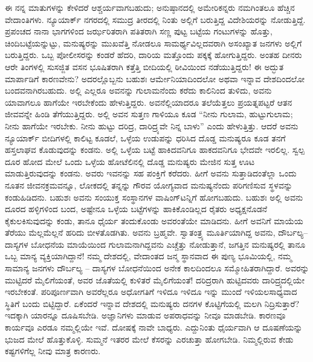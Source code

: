 ಈ ನನ್ನ ಮಾತುಗಳನ್ನು ಕೇಳಿದರೆ ಆಶ್ಚರ್ಯವಾಗಬಹುದು; ಅನುಷ್ಠಾನದಲ್ಲಿ ಅಮೇರಿಕನ್ನರು ನಮಗಿಂತಲೂ ಹೆಚ್ಚಿನ ವೇದಾಂತಿಗಳು. ನ್ಯೂಯಾರ್ಕ್​ ನಗರದಲ್ಲಿ ಸಮುದ್ರ ತೀರದಲ್ಲಿ ನಿಂತು ಅಲ್ಲಿಗೆ ಬರುತ್ತಿದ್ದ ವಿದೇಶಿಯರನ್ನು ನೋಡುತ್ತಿದ್ದೆ. ಪ್ರಪಂಚದ ನಾನಾ ಭಾಗಗಳಿಂದ ಜರ್ಝರಿತರಾಗಿ ಪತಿತರಾಗಿ ಸಣ್ಣ ಪುಟ್ಟ ಬಟ್ಟೆಯ ಗಂಟುಗಳನ್ನು ಹೊತ್ತು, ಚಿಂದಿಬಟ್ಟೆಯನ್ನುಟ್ಟು, ಮನುಷ್ಯರನ್ನು ಮುಖವೆತ್ತಿ ನೋಡಲೂ ಸಾಮರ್ಥ್ಯವಿಲ್ಲದವರಾಗಿ ಅಸಂಖ್ಯಾತ ಜನಗಳು ಅಲ್ಲಿಗೆ ಬರುತ್ತಿದ್ದರು. ಒಬ್ಬ ಪೋಲೀಸರನ್ನು ಕಂಡರೆ ಹೆದರಿ, ದಾರಿಯ ಮತ್ತೊಂದು ಪಕ್ಕಕ್ಕೆ ಹೋಗುತ್ತಿದ್ದರು. ಅಂತಹ ದೀನರು ಆರೇ ತಿಂಗಳಲ್ಲಿ ಸುಸಜ್ಜಿತ ವಸನ ಭೂಷಿತರಾಗಿ ಕತ್ತೆತ್ತಿ ಬೀದಿಯಲ್ಲಿ ಠೀವಿಯಿಂದ ನಡೆಯುತ್ತಿದ್ದರು! ಈ ಅದ್ಭುತ ಮಾರ್ಪಾಡಿಗೆ ಕಾರಣವೇನು? ಅದರಲ್ಲೊಬ್ಬನು ಬಹುಶಃ ಆರ್ಮೇನಿಯಾದಿಂದಲೋ ಅಥವಾ ಇನ್ನಾವ ದೇಶದಿಂದಲೋ ಬಂದವನಾಗಿರಬಹುದು. ಅಲ್ಲಿ ಎಲ್ಲರೂ ಅವನನ್ನು ಗುಲಾಮನೆಂದು ಕರೆದು ಕಾಲಿನಿಂದ ತುಳಿದು, ಅವನು ಯಾವಾಗಲೂ ಹಾಗೆಯೇ ಇರಬೇಕೆಂದು ಹೇಳುತ್ತಿದ್ದರು. ಅವನೆಲ್ಲಿಯಾದರೂ ತಲೆಯೆತ್ತಲು ಪ್ರಯತ್ನಪಟ್ಟರೆ ಆತನ ಜೀವವನ್ನೇ ಹಿಂಡಿ ತೆಗೆಯುತ್ತಿದ್ದರು. ಅಲ್ಲಿ ಅವನ ಸುತ್ತಣ ಗಾಳಿಯೂ ಕೂಡ “ನೀನು ಗುಲಾಮ, ಹುಟ್ಟುಗುಲಾಮ; ನೀನು ಹಾಗೆಯೇ ಇರಬೇಕು. ನೀನು ಹುಟ್ಟು ದರಿದ್ರ, ದಾರಿದ್ರ್ಯವೇ ನಿನ್ನ ಬಾಳು” ಎಂದು ಹೇಳುತ್ತಿತ್ತು. ಆದರೆ ಅವನು ನ್ಯೂಯಾರ್ಕ್​ ಬೀದಿಗಳಲ್ಲಿ ಕಾಲಿಟ್ಟ ಕೂಡಲೆ, ಒಳ್ಳೆಯ ಉಡುಪನ್ನು ಧರಿಸಿದ ದೊಡ್ಡ ಮನುಷ್ಯರೂ ಕೂಡ ತನಗೆ ಹಸ್ತಲಾಘವ ಕೊಡುವುದನ್ನು ಕಂಡನು. ಅಲ್ಲಿ ಒಳ್ಳೆಯ ಬಟ್ಟೆ ಹಾಕಿದವನಿಗೂ ಹಾಕದವನಿಗೂ ಭೇದವೇ ಇರಲಿಲ್ಲ. ಸ್ವಲ್ಪ ದೂರ ಹೋದ ಮೇಲೆ ಒಂದು ಒಳ್ಳೆಯ ಹೋಟೆಲಿನಲ್ಲಿ ದೊಡ್ಡ ಮನುಷ್ಯರು ಮೇಜಿನ ಸುತ್ತ ಊಟ ಮಾಡುತ್ತಿರುವುದನ್ನು ಕಂಡನು. ಅವರು ಇವನನ್ನು ಸಹ ಪಂಕ್ತಿಗೆ ಕರೆದರು. ಹೀಗೆ ಅವನು ಸುತ್ತಾಡಿದಂತೆಲ್ಲಾ ಒಂದು ನೂತನ ಜೀವನಕ್ರಮವನ್ನೂ, ಲೋಕದಲ್ಲಿ ತನ್ನನ್ನು ಗೌರವ ಯೋಗ್ಯವಾದ ಮನುಷ್ಯನೆಂದು ಪರಿಗಣಿಸುವ ಸ್ಥಳವನ್ನು ಕಂಡುಹಿಡಿದನು. ಬಹುಶಃ ಅವನು ಸಂಯುಕ್ತ ಸಂಸ್ಥಾನಗಳ ವಾಷಿಂಗ್​ಟನ್ನಿಗೆ ಹೋಗಬಹುದು. ಬಹುಶಃ ಅಲ್ಲಿ ಅವನು ದೂರದ ಹಳ್ಳಿಗಳಿಂದ ಬಂದ, ಅಷ್ಟೇನೂ ಒಳ್ಳೆಯ ಬಟ್ಟೆಗಳನ್ನು ಹಾಕಿಕೊಂಡಿಲ್ಲದ ರೈತರು ಅಧ್ಯಕ್ಷನೊಡನೆ ಕೈಕುಲಕಿಸುವುದನ್ನು ಕಂಡು, ತಾನೂ ಧೈರ್ಯ ತಂದುಕೊಂಡು ಅವರಂತೆಯೇ ಮಾಡಿದನು. ಹೀಗೆ ಅವನಿಗೆ ಮಾಯೆಯ ತೆರೆಯು ಮೆಲ್ಲಮೆಲ್ಲನೆ ಹರಿದು ಬೀಳತೊಡಗಿತು. ಅವನು ಬ್ರಹ್ಮವೇ. ಸ್ವಾತಂತ್ರ್ಯ ಮೂರ್ತಿಯಾಗಿದ್ದ ಅವನು, ದೌರ್ಬಲ್ಯ–ದಾಸ್ಯಗಳ ಬೋಧನೆಯ ಮಾಯೆಯಿಂದ ಗುಲಾಮನಾಗಿದ್ದವನು ಎಚ್ಚೆತ್ತು ನೋಡುತ್ತಾನೆ, ಜಗತ್ತಿನ ಮನುಷ್ಯರಲ್ಲಿ ತಾನೂ ಒಬ್ಬ ಮಾನ್ಯ ವ್ಯಕ್ತಿಯಾಗಿದ್ದಾನೆ! ನಮ್ಮ ದೇಶದಲ್ಲಿ, ವೇದಾಂತದ ಜನ್ಮ ಸ್ಥಾನವಾದ ಈ ಪುಣ್ಯ ಭೂಮಿಯಲ್ಲಿ, ನಮ್ಮ ಸಾಮಾನ್ಯ ಜನಗಳು ದೌರ್ಬಲ್ಯ – ದಾಸ್ಯಗಳ ಬೋಧನೆಯಿಂದ ಅನೇಕ ಕಾಲದಿಂದಲೂ ಸಮ್ಮೋಹಿತರಾಗಿದ್ದಾರೆ. ಅವರನ್ನು ಮುಟ್ಟಿದರೆ ಮೈಲಿಗೆಯಂತೆ, ಅವರ ಜೊತೆಯಲ್ಲಿ ಕುಳಿತರೆ ಮೈಲಿಗೆಯಂತೆ! ದರಿದ್ರರಾಗಿ ಹುಟ್ಟಿದವರು ದಾರಿದ್ರ್ಯದಲ್ಲಿಯೇ ಇರಬೇಕಂತೆ. ಪರಿಪೂರ್ಣವಾಗಿ ಅವರೆಲ್ಲರೂ ಅಧೋಗತಿಗೆ ಇಳಿದೂ ಇಳಿದೂ ಇನ್ನು ಮುಂದೆ ಇಳಿಯಲಸಾಧ್ಯವಾದ ಸ್ಥಿತಿಗೆ ಬಂದು ಬಿಟ್ಟಿದ್ದಾರೆ. ಏಕೆಂದರೆ ಇನ್ನಾವ ದೇಶದಲ್ಲಿ ಮನುಷ್ಯರು ದನಗಳ ಕೊಟ್ಟಿಗೆಯಲ್ಲಿ ಮಲಗಿ ನಿದ್ರಿಸುತ್ತಾರೆ? ಇದಕ್ಕಾಗಿ ಯಾರನ್ನೂ ದೂಷಿಸಬೇಡಿ. ಅಜ್ಞಾನಿಗಳು ಮಾಡುವ ಅಪರಾಧವನ್ನು ನೀವೂ ಮಾಡಬೇಡಿ. ಕಾರಣವೂ ಕಾರ್ಯವೂ ಎರಡೂ ನಮ್ಮಲ್ಲಿಯೇ ಇವೆ. ದೋಷಕ್ಕೆ ನಾವೇ ಬಾಧ್ಯರು. ಎದ್ದುನಿಂತು ಧೈರ್ಯವಾಗಿ ಆ ದೂಷಣೆಯನ್ನು ಭುಜದ ಮೇಲೆ ಹೊತ್ತುಕೊಳ್ಳಿ. ಸುಮ್ಮನೆ ಇತರರ ಮೇಲೆ ಕೆಸರನ್ನು ಎರಚುತ್ತಾ ಹೋಗಬೇಡಿ. ನಿಮ್ಮಲ್ಲಿರುವ ಕೇಡು ಕಷ್ಟಗಳಿಗೆಲ್ಲ ನೀವು ಮಾತ್ರ ಕಾರಣರು.

